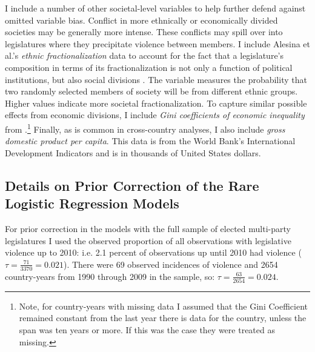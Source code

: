 \documentclass[a4paper]{article}\usepackage[]{graphicx}\usepackage[]{color}
\begin{document}
I include a number of other societal-level variables to help further defend against omitted variable bias. Conflict in more ethnically or economically divided societies may be generally more intense. These conflicts may spill over into legislatures where they precipitate violence between members. I include Alesina et al.'s \citeyearpar{Alesina2003} {\emph{ethnic fractionalization}} data to account for the fact that a legislature's composition in terms of its fractionalization is not only a function of political institutions, but also social divisions \citep{Neto1997, Mozaffar2003}. The variable measures the probability that two randomly selected members of society will be from different ethnic groups. Higher values indicate more societal fractionalization. To capture similar possible effects from economic divisions, I include {\emph{Gini coefficients of economic inequality}} from \cite{UNU2008}.\footnote{Note, for country-years with missing data I assumed that the Gini Coefficient remained constant from the last year there is data for the country, unless the span was ten years or more. If this was the case they were treated as missing.} Finally, as is common in cross-country analyses, I also include {\emph{gross domestic product per capita}}. This data is from the World Bank's International Development Indicators \citeyearpar{WorldBank2011} and is in thousands of United States dollars.

\subsection*{Details on Prior Correction of the Rare Logistic Regression Models}

For prior correction \citep[see][]{KingRareEventsPA2001} in the models with the full sample of elected multi-party legislatures I used the observed proportion of all observations with legislative violence up to 2010: i.e. 2.1 percent of observations up until 2010 had violence ($\tau = \frac{71}{3370} = 0.021$). There were 69 observed incidences of violence and 2654 country-years from 1990 through 2009 in the sample, so: $\tau = \frac{63}{2654} = 0.024$.
\end{document}
